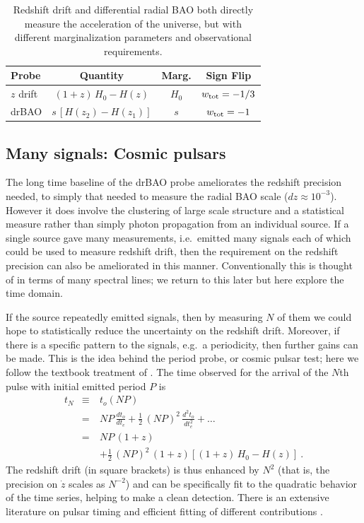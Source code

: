 \documentclass[preprint2, 10pt]{aastex}
\newcommand{\bea}{\begin{eqnarray}}
\newcommand{\eea}{\end{eqnarray}}
\begin{document}
\begin{table}[!htb]
\small 
\begin{tabular}{l|ccc} 
Probe  &  Quantity  & Marg. & Sign Flip\\ 
\hline 
$z$ drift &$(1+z)\,H_0-H(z)$ & $H_0$ & $w_{\rm tot}=-1/3$ \\ 
drBAO & $s\,[H(z_2)-H(z_1)]$ & $s$ & $w_{\rm tot}=-1$ \\ 
\end{tabular} 
\caption{Redshift drift and differential radial BAO both 
directly measure the acceleration of the universe, but with different 
marginalization parameters and observational requirements. 
} 
\label{tab:drbao} 
\end{table} 
\subsection{Many signals: Cosmic pulsars} 

The long time baseline of the drBAO probe ameliorates the redshift 
precision needed, to simply that needed to measure the radial BAO scale 
($dz\approx10^{-3}$).  However it does involve the clustering of large scale 
structure and a statistical measure rather than simply photon propagation 
from an individual source.  If a single source gave many measurements, 
i.e.\ emitted many signals each of which could be used to measure redshift 
drift, then the requirement on the redshift precision can also be 
ameliorated in this manner.  
Conventionally this is thought of in terms of many spectral lines; we 
return to this later but here explore the time domain. 

If the source repeatedly emitted signals, then by measuring $N$ of them 
we could hope to statistically reduce the uncertainty on the redshift drift.  
Moreover, if there 
is a specific pattern to the signals, e.g.\ a periodicity, then further 
gains can be made.  This is the idea behind the period probe, or cosmic 
pulsar test; here we follow the textbook treatment of \citet{fpoc}.  The time 
observed for the arrival of the $N$th pulse with initial emitted period $P$ is 
\bea 
t_N&\equiv& t_o(NP)\nonumber\\ 
&=&NP\,\frac{dt_o}{dt_e}+\frac{1}{2}\,(NP)^2\,\frac{d^2t_o}{dt_e^2}+\dots\\ 
&=&NP\,(1+z)\nonumber\\ 
&\quad&+\frac{1}{2}\,(NP)^2\,(1+z)\left[(1+z)\,H_0-H(z)\right]\ . 
\eea 
The redshift drift (in square brackets) is thus enhanced by $N^2$ (that 
is, the precision on $\dot z$ scales as $N^{-2}$) and 
can be specifically fit to the quadratic behavior of the time series, 
helping to make a clean detection.  There is an extensive literature on 
pulsar timing and efficient fitting of different contributions 
\citep{pulsars}. 
\end{document}
